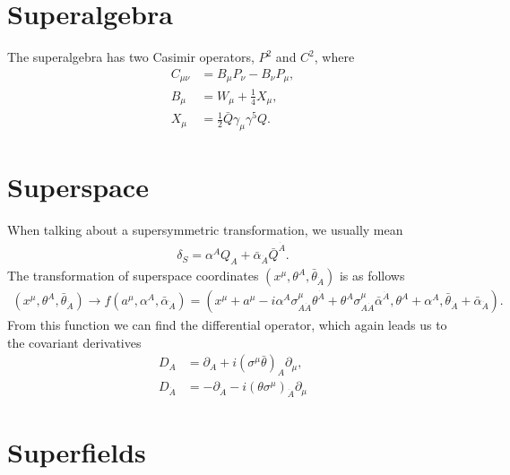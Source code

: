 \documentclass[twoside,english]{uiofysmaster}
\begin{document}
\section{Superalgebra}

The superalgebra has two Casimir operators, $P^2$ and $C^2$, where
\begin{align}
C_{\mu \nu} &= B_{\mu} P_{\nu} - B_{\nu} P_{\mu},\\
B_{\mu} &= W_{\mu}  + \frac{1}{4} X_{\mu},\\
X_{\mu} &= \frac{1}{2} \bar{Q} \gamma_{\mu} \gamma^5 Q.
\end{align}

\section{Superspace}

When talking about a supersymmetric transformation, we usually mean 
\begin{align}
\delta_S = \alpha^A Q_A + \bar{\alpha}_{\dot{A}} \bar{Q}^{\dot{A}}.
\end{align}
The transformation of superspace coordinates $(x^{\mu}, \theta^A, \bar{\theta}_{\dot{A}})$ is as follows
\begin{align}
(x^{\mu}, \theta^A, \bar{\theta}_{\dot{A}}) \rightarrow f(a^{\mu}, \alpha^A, \bar{\alpha}_{\dot{A}}) = (x^{\mu} + a^{\mu} - i \alpha^A \sigma^{\mu}_{A \dot{A}} \theta^{\dot{A}} + \theta^A \sigma^{\mu}_{A \dot{A}} \bar{\alpha}^{\dot{A}}, \theta^A + \alpha^A, \bar{\theta}_{\dot{A}} + \bar{\alpha}_{\dot{A}} ).
\end{align}
From this function we can find the differential operator, which again leads us to the covariant derivatives
\begin{align}
D_A &= \partial_A  + i(\sigma^{\mu} \bar{\theta})_A \partial_{\mu},\\
D_{\dot{A}} &= -\partial_{\dot{A}} - i(\theta \sigma^{\mu})_{\dot{A}} \partial_{\mu}   
\end{align}

\section{Superfields}
\end{document}
